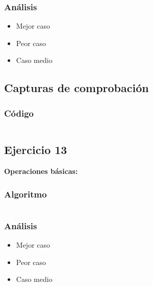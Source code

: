 \documentclass[12pt, letterpaper]{article}			%
\begin{document}
	        \subsubsection{Análisis}
	    		\begin{itemize}
	    			\item[\Checklist] Mejor caso \\

	    			\item[\Checklist] Peor caso \\
					
					\item[\Checklist] Caso medio \\

				\end{itemize}
	        \subsection{Capturas de comprobación}

	        \subsubsection{Código}
	            \begin{lstlisting}[style=Java]
    		    \end{lstlisting}

	    \subsection{Ejercicio 13}
		\textbf{Operaciones básicas:}
			\subsubsection{Algoritmo}
			    \begin{lstlisting}[style=Java]
    		    \end{lstlisting}

			\subsubsection{Análisis}
	    		\begin{itemize}
	    			\item[\Checklist] Mejor caso \\

	    			\item[\Checklist] Peor caso \\
					
					\item[\Checklist] Caso medio \\

				\end{itemize}	        
\end{document}
